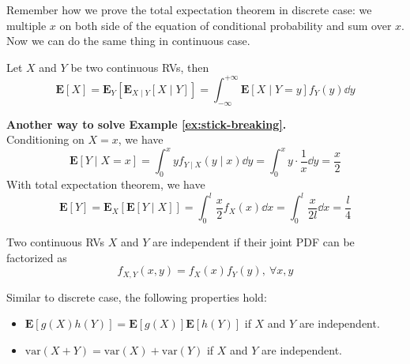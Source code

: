 Remember how we prove the total expectation theorem in discrete case: we multiple $x$ on both side of the equation of conditional probability and sum over $x$. Now we can do the same thing in continuous case.
\begin{theorem}
    Let $X$ and $Y$ be two continuous RVs, then
    \begin{equation}
        \mathbf{E}[X] = \mathbf{E}_{Y}\left[\mathbf{E}_{X \mid Y}[X \mid Y]\right] =  \int_{-\infty}^{+\infty} \mathbf{E}[X \mid Y = y] f_{Y}(y) \dd{y}
    \end{equation}
\end{theorem}

\begin{solution}
    \textbf{Another way to solve Example \ref{ex:stick-breaking}.} \\ 
    Conditioning on $X = x$, we have
    \begin{equation}
        \mathbf{E}[Y \mid X = x] = \int_{0}^{x} y f_{Y \mid X}(y \mid x) \dd{y} = \int_{0}^{x} y \cdot \frac{1}{x} \dd{y} = \frac{x}{2}
    \end{equation}
    With total expectation theorem, we have
    \begin{equation}
        \mathbf{E}[Y] = \mathbf{E}_{X}\left[\mathbf{E}[Y \mid X]\right] = \int_{0}^{l} \frac{x}{2} f_{X}(x) \dd{x} = \int_{0}^{l} \frac{x}{2l} \dd{x} = \frac{l}{4}
    \end{equation}
\end{solution}

\begin{definition}[Independence]
    Two continuous RVs $X$ and $Y$ are independent if their joint PDF can be factorized as
    \begin{equation}
        f_{X, Y}(x, y) = f_{X}(x) f_{Y}(y), ~\forall x, y
    \end{equation}
\end{definition}
Similar to discrete case, the following properties hold:
\begin{property}
    \begin{itemize}
        \item $\mathbf{E}[g(X)h(Y)] = \mathbf{E}[g(X)]\mathbf{E}[h(Y)]$ if $X$ and $Y$ are independent.
        \item $\text{var}(X + Y) = \text{var}(X) + \text{var}(Y)$ if $X$ and $Y$ are independent.
    \end{itemize}
\end{property}


